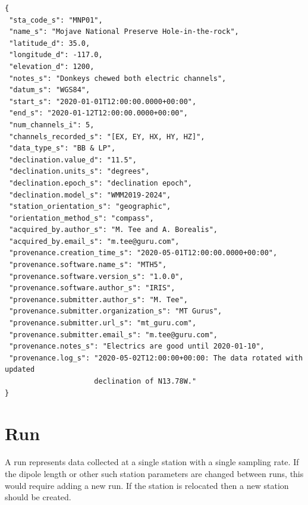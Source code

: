 \documentclass{article}
\begin{document}
\begin{verbatim}
{
 "sta_code_s": "MNP01",
 "name_s": "Mojave National Preserve Hole-in-the-rock",
 "latitude_d": 35.0,
 "longitude_d": -117.0,
 "elevation_d": 1200,
 "notes_s": "Donkeys chewed both electric channels",
 "datum_s": "WGS84",
 "start_s": "2020-01-01T12:00:00.0000+00:00",
 "end_s": "2020-01-12T12:00:00.0000+00:00",
 "num_channels_i": 5,
 "channels_recorded_s": "[EX, EY, HX, HY, HZ]",
 "data_type_s": "BB & LP",
 "declination.value_d": "11.5",
 "declination.units_s": "degrees",
 "declination.epoch_s": "declination epoch",
 "declination.model_s": "WMM2019-2024",
 "station_orientation_s": "geographic",
 "orientation_method_s": "compass",
 "acquired_by.author_s": "M. Tee and A. Borealis",
 "acquired_by.email_s": "m.tee@guru.com",
 "provenance.creation_time_s": "2020-05-01T12:00:00.0000+00:00",
 "provenance.software.name_s": "MTH5",
 "provenance.software.version_s": "1.0.0",
 "provenance.software.author_s": "IRIS",
 "provenance.submitter.author_s": "M. Tee",
 "provenance.submitter.organization_s": "MT Gurus",
 "provenance.submitter.url_s": "mt_guru.com",
 "provenance.submitter.email_s": "m.tee@guru.com",
 "provenance.notes_s": "Electrics are good until 2020-01-10",
 "provenance.log_s": "2020-05-02T12:00:00+00:00: The data rotated with updated
                     declination of N13.78W."
}
\end{verbatim}

\newpage
\section{Run}

A run represents data collected at a single station with a single sampling rate. If the dipole length or other such station parameters are changed between runs, this would require adding a new run.  If the station is relocated then a new station should be created.
\end{document}
